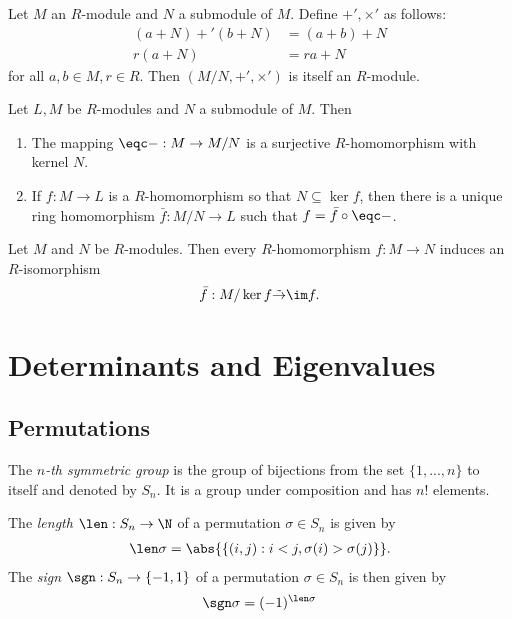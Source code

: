 \documentclass{article}
\begin{document}
\begin{theorem}[Notes 3.7.31]
    Let $M$ an $R$-module and $N$ a submodule of $M$. Define $+',\times'$ as follows:
    \begin{align*}
        (a+N)+'(b+N) &= (a+b)+N\\
        r(a+N) &= ra + N 
    \end{align*}
    for all $a,b\in M,r\in R$. Then $(M/N,+',\times')$ is itself an $R$-module.
\end{theorem}

\begin{theorem}[Notes 3.7.32]
    Let $L,M$ be $R$-modules and $N$ a submodule of $M$. Then
    \begin{enumerate}
        \item The mapping $\eqc - : M\to M/N$ is a surjective $R$-homomorphism with kernel $N$.
        \item If $f:M\to L$ is a $R$-homomorphism so that $N\subseteq\ker f$, then there 
            is a unique ring homomorphism $\bar f:M/N\to L$ such that $f=\bar f\circ\eqc -$.
    \end{enumerate} 
\end{theorem}

\begin{theorem}
    Let $M$ and $N$ be $R$-modules. Then every $R$-homomorphism $f:M\to N$ induces an $R$-isomorphism
    \begin{align*}
        \bar f:M/\ker f \tilde\to \im f.
    \end{align*} 
\end{theorem}

\section{Determinants and Eigenvalues}

\subsection{Permutations}

\begin{definition}
    The \emph{$n$-th symmetric group} is the group of bijections from the set $\{1,...,n\}$ to itself
    and denoted by $S_n$. It is a group under composition and has $n!$ elements.
\end{definition}

\begin{definition}
    The \emph{length} $\len:S_n\to\N$ of a permutation $\sigma\in S_n$ is given by 
    \begin{align*}
        \len \sigma = \abs{\{(i,j):i<j,\sigma(i)>\sigma(j)\}}.
    \end{align*}
    The \emph{sign} $\sgn:S_n\to\{-1,1\}$ of a permutation $\sigma\in S_n$ is then 
    given by 
    \begin{align*}
        \sgn \sigma = (-1)^{\len \sigma}
    \end{align*}
\end{definition}
\end{document}
